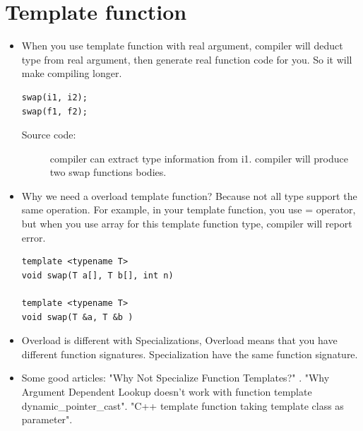 \documentclass[a4paper,11pt,twoside]{book}
\begin{document}
\section{Template function}
\begin{itemize}
	\item When you use template function with real argument, compiler will deduct type from real argument, then generate real function code for you.  So it will make compiling longer.
	
\begin{lstlisting}[numbers=none]
swap(i1, i2);
swap(f1, f2);
\end{lstlisting}
\begin{description}
	\item[Source code:] compiler can extract type information from i1. compiler will produce two swap functions bodies.
\end{description}

	\item Why we need a overload template function? Because not all type support the same operation. For example, in your template function, you use = operator, but when you use array for this template function type, compiler will report error.
\begin{lstlisting}[numbers=none]
template <typename T>
void swap(T a[], T b[], int n)

template <typename T>
void swap(T &a, T &b )
\end{lstlisting}

\item Overload is different with Specializations, Overload means that you have different function signatures. Specialization have the same function signature.

\item Some good articles:\newline
"Why Not Specialize Function Templates?" .
\newline
"Why Argument Dependent Lookup doesn't work with function template dynamic\_pointer\_cast". 
\newline
"C++ template function taking template class as parameter".
\end{itemize}
\end{document}
